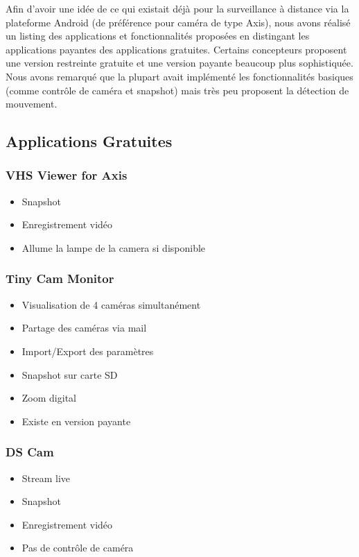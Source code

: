 Afin d'avoir une idée de ce qui existait déjà pour la surveillance à distance via la plateforme Android (de préférence pour caméra de type Axis), nous avons réalisé un listing des applications
et fonctionnalités proposées en distingant les applications payantes des applications gratuites. Certains concepteurs proposent une version restreinte gratuite et une version payante beaucoup
plus sophistiquée. Nous avons remarqué que la plupart avait implémenté les fonctionnalités basiques (comme contrôle de caméra et snapshot) mais très peu proposent la détection de mouvement.

\subsection{Applications Gratuites}
\subsubsection{VHS Viewer for Axis}
\begin{itemize}
  \item Snapshot
  \item Enregistrement vidéo
  \item Allume la lampe de la camera si disponible
\end{itemize}

\subsubsection{Tiny Cam Monitor}
\begin{itemize}
  \item Visualisation de 4 caméras simultanément
  \item Partage des caméras via mail
  \item Import/Export des paramètres
  \item Snapshot sur carte SD
  \item Zoom digital
  \item Existe en version payante
\end{itemize}

\subsubsection{DS Cam}
\begin{itemize}
  \item Stream live
  \item Snapshot
  \item Enregistrement vidéo
  \item Pas de contrôle de caméra
\end{itemize}

